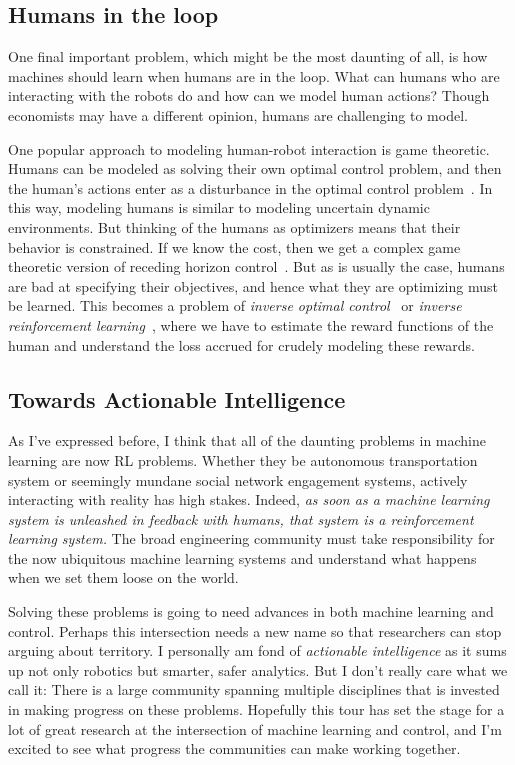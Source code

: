 \documentclass[11pt]{article}
\numberwithin{equation}{section}
\begin{document}
\subsection{Humans in the loop}

One final important problem, which might be the most daunting of all, is how machines should learn when humans are in the loop. What can humans who are interacting with the robots do and how can we model human actions?  Though economists may have a different opinion, humans are challenging to model.

One popular approach to modeling human-robot interaction is game theoretic. Humans can be modeled as solving their own optimal control problem, and then the human's actions enter as a disturbance in the optimal control problem~\cite{sadigh2016planning}. In this way, modeling humans is similar to modeling uncertain dynamic environments. But thinking of the humans as optimizers means that their behavior is constrained. If we know the cost, then we get a complex game theoretic version of receding horizon control~\cite{bialas1989cooperative,li2017game}. But as is usually the case, humans are bad at specifying their objectives, and hence what they are optimizing must be learned. This becomes a problem of \emph{inverse optimal control}~\cite{kalman1964linear} or \emph{inverse reinforcement learning}~\cite{ng2000algorithms}, where we have to estimate the reward functions of the human and understand the loss accrued for crudely modeling these rewards.

\subsection{Towards Actionable Intelligence}

As I've expressed before, I think that all of the daunting problems in machine learning are now RL problems. Whether they be  autonomous transportation system or seemingly mundane social network engagement systems, actively interacting with reality has high stakes. Indeed, \emph{as soon as a machine learning system is unleashed in feedback with humans, that system is a reinforcement learning system.} The broad engineering community must take responsibility for the now ubiquitous machine learning systems and understand what happens when we set them loose on the world.

Solving these problems is going to need advances in both machine learning and control.  Perhaps this intersection needs a new name so that researchers can stop arguing about territory. I personally am fond of \emph{actionable intelligence} as it sums up not only robotics but smarter, safer analytics. But I don't really care what we call it: There is a large community spanning multiple disciplines that is invested in making progress on these problems. Hopefully this tour has set the stage for a lot of great research at the intersection of machine learning and control, and I'm excited to see what progress the communities can make working together.
\end{document}

